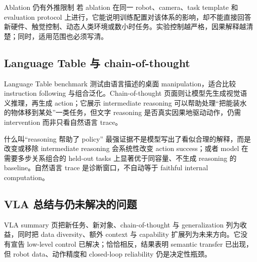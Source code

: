 
\begin{warningbox}{Ablation 仍有外推限制}
若 ablation 在同一 robot、camera、task template 和 evaluation protocol 上进行，它能说明训练配置对该体系的影响，却不能直接回答新硬件、触觉控制、动态人类环境或数小时任务。实验控制越严格，因果解释越清楚；同时，适用范围也必须写清。
\end{warningbox}

\subsection{Language Table 与 chain-of-thought}

Language Table benchmark 测试由语言描述的桌面 manipulation，适合比较 instruction following 与组合泛化。Chain-of-thought 页面则让模型先生成视觉语义推理，再生成 action；它展示 intermediate reasoning 可以帮助处理“把能装水的物体移到某处”一类任务，但文字 reasoning 是否真实因果地驱动动作，仍需 intervention 而非只看自然语言 trace。



\begin{knowledgebox}{什么叫“reasoning 帮助了 policy”}
最强证据不是模型写出了看似合理的解释，而是改变或移除 intermediate reasoning 会系统性改变 action success；或者 model 在需要多步关系组合的 held-out tasks 上显著优于同容量、不生成 reasoning 的 baseline。自然语言 trace 是诊断窗口，不自动等于 faithful internal computation。
\end{knowledgebox}

\subsection{VLA 总结与仍未解决的问题}

VLA summary 页把新任务、新对象、chain-of-thought 与 generalization 列为收益，同时把 data diversity、额外 context 与 capability 扩展列为未来方向。它没有宣告 low-level control 已解决；恰恰相反，结果表明 semantic transfer 已出现，但 robot data、动作精度和 closed-loop reliability 仍是决定性瓶颈。



